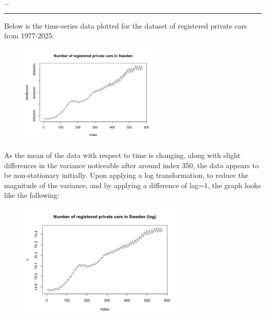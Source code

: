 \documentclass[a4paper,11pt]{article}
\begin{document}
    \_    
    \hrule

    Below is the time-series data plotted for the dataset of registered private cars from 1977-2025:

    \begin{figure}[H]
        \centering
        \includegraphics[width=0.6\textwidth]{ha-1_files/figure-markdown_strict/unnamed-chunk-1-1.png}
        \label{fig:f1}
    \end{figure}

    As the mean of the data with respect to time is changing, along with slight differences in the variance noticeable after around index 350, the data appears to be non-stationary initially. Upon applying a log transformation, to reduce the magnitude of the variance, and by applying a difference of lag=1, the graph looks like the following:

    \begin{figure}[H]
        \centering
        \includegraphics[width=0.7\textwidth]{ha-1_files/figure-markdown_strict/unnamed-chunk-1-2.png}
        \label{fig:f2}
    \end{figure}
\end{document}
